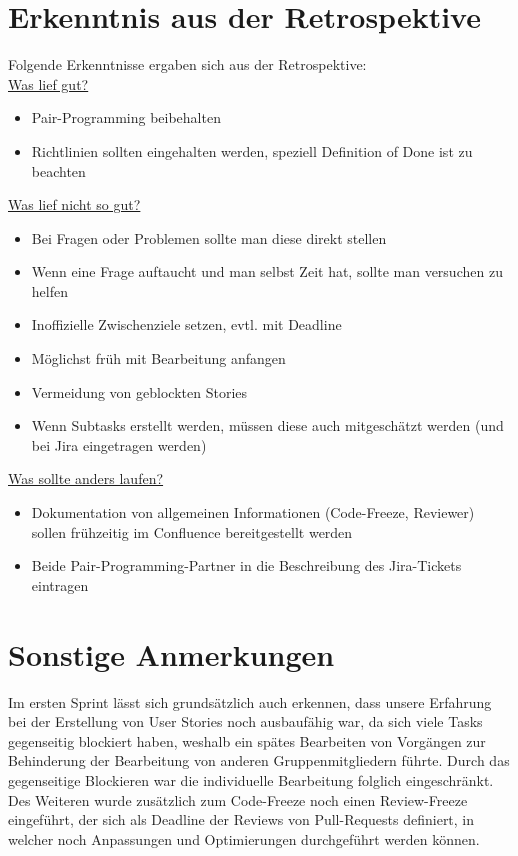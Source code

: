 \documentclass[12pt,a4paper, oneside]{article}
\begin{document}
    \section{Erkenntnis aus der Retrospektive}
    Folgende Erkenntnisse ergaben sich aus der Retrospektive:\\

    \underline{Was lief gut?}
    \begin{itemize}
        \item Pair-Programming beibehalten
        \item Richtlinien sollten eingehalten werden, speziell Definition of Done ist zu beachten
        \\
    \end{itemize}

    \underline{Was lief nicht so gut?}
    \begin{itemize}
        \item Bei Fragen oder Problemen sollte man diese direkt stellen
        \item Wenn eine Frage auftaucht und man selbst Zeit hat, sollte man versuchen zu helfen
        \item Inoffizielle Zwischenziele setzen, evtl. mit Deadline
        \item Möglichst früh mit Bearbeitung anfangen
        \item Vermeidung von geblockten Stories
        \item Wenn Subtasks erstellt werden, müssen diese auch mitgeschätzt werden (und bei Jira eingetragen werden)
        \\
    \end{itemize}

    \underline{Was sollte anders laufen?}
    \begin{itemize}
        \item Dokumentation von allgemeinen Informationen (Code-Freeze, Reviewer) sollen frühzeitig im Confluence bereitgestellt werden
        \item Beide Pair-Programming-Partner in die Beschreibung des Jira-Tickets eintragen
    \end{itemize}

    \section{Sonstige Anmerkungen}
    Im ersten Sprint lässt sich grundsätzlich auch erkennen, dass unsere Erfahrung bei der Erstellung von User Stories noch ausbaufähig war, da sich viele Tasks gegenseitig blockiert haben, weshalb ein spätes Bearbeiten von Vorgängen zur Behinderung der Bearbeitung von anderen Gruppenmitgliedern führte. Durch das gegenseitige Blockieren war die individuelle Bearbeitung folglich eingeschränkt. Des Weiteren wurde zusätzlich zum Code-Freeze noch einen Review-Freeze eingeführt, der sich als Deadline der Reviews von Pull-Requests definiert, in welcher noch Anpassungen und Optimierungen durchgeführt werden können.
\end{document}
